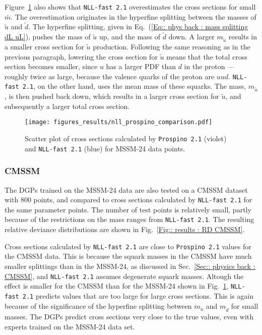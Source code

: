 \documentclass[twoside,english]{uiofysmaster}
\begin{document}
{{Figure~\ref{Fig:: results : Scatter plot MSSM-24 prospino nll} also shows that \verb|NLL-fast 2.1| overestimates the cross sections for small $\bar{m}$. The overestimation originates in the hyperfine splitting between the masses of $\widetilde{u}$ and $\widetilde{d}$. The hyperfine splitting, given in Eq.~(\ref{Eq:: phys back : mass splitting dL uL}), pushes the mass of $\widetilde{u}$ up, and the mass of $\widetilde{d}$ down. A larger $m_{\widetilde{u}}$ results in a smaller cross section for $\widetilde{u}$ production. Following the same reasoning as in the previous paragraph, lowering the cross section for $\widetilde{u}$ means that the total cross section becomes smaller, since $u$ has a larger PDF than $d$ in the proton --- roughly twice as large, because the valence quarks of the proton are $uud$. \verb|NLL-fast 2.1|, on the other hand, uses the mean mass of these squarks. The mass, $m_{\widetilde{u}}$, is then pushed back down, which results in a larger cross section for $\widetilde{u}$, and subsequently a larger total cross section. 

\begin{figure}
\centering
\texttt{[image: figures\_results/nll\_prospino\_comparison.pdf]}
\caption{Scatter plot of cross sections calculated by {\tt  Prospino 2.1} (violet) and {\tt NLL-fast 2.1} (blue) for MSSM-24 data points.}
\label{Fig:: results : Scatter plot MSSM-24 prospino nll}
\end{figure}

\subsubsection{CMSSM}

The DGPs trained on the MSSM-24 data are also tested on a CMSSM dataset with 800 points, and compared to cross sections calculated by \verb|NLL-fast 2.1| for the same parameter points. The number of test points is relatively small, partly because of the restrictions on the mass ranges from \verb|NLL-fast 2.1|. The resulting relative deviance distributions are shown in Fig.~\ref{Fig:: results : RD CMSSM}. 

Cross sections calculated by \verb|NLL-fast 2.1| are close to \verb|Prospino 2.1| values for the CMSSM data. This is because the squark masses in the CMSSM have much smaller splittings than in the MSSM-24, as discussed in Sec.~\ref{Sec:: physics back : CMSSM}, and \verb|NLL-fast 2.1| assumes degenerate squark masses. Altough the effect is smaller for the CMSSM than for the MSSM-24 shown in Fig.~\ref{Fig:: results : Scatter plot MSSM-24 prospino nll}, \verb|NLL-fast 2.1| predicts values that are too large for large cross sections. This is again because of the significance of the hyperfine splitting between $m_{\widetilde{u}}$ and $m_{\widetilde{d}}$ for small masses. The DGPs predict cross sections very close to the true values, even with experts trained on the MSSM-24 data set. 

}}
\end{document}
